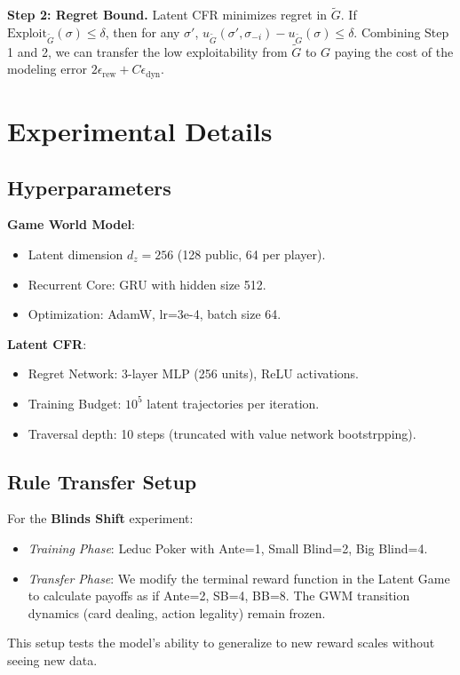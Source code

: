 \documentclass{article}
\begin{document}
\textbf{Step 2: Regret Bound.}
Latent CFR minimizes regret in $\tilde{G}$. If $\text{Exploit}_{\tilde{G}}(\sigma) \le \delta$, then for any $\sigma'$, $u_{\tilde{G}}(\sigma', \sigma_{-i}) - u_{\tilde{G}}(\sigma) \le \delta$.
Combining Step 1 and 2, we can transfer the low exploitability from $\tilde{G}$ to $G$ paying the cost of the modeling error $2\epsilon_\text{rew} + C \epsilon_\text{dyn}$.

\section{Experimental Details}

\subsection{Hyperparameters}
\textbf{Game World Model}:
\begin{itemize}
    \item Latent dimension $d_z = 256$ (128 public, 64 per player).
    \item Recurrent Core: GRU with hidden size 512.
    \item Optimization: AdamW, lr=3e-4, batch size 64.
\end{itemize}

\textbf{Latent CFR}:
\begin{itemize}
    \item Regret Network: 3-layer MLP (256 units), ReLU activations.
    \item Training Budget: $10^5$ latent trajectories per iteration.
    \item Traversal depth: 10 steps (truncated with value network bootstrpping).
\end{itemize}

\subsection{Rule Transfer Setup}
For the \textbf{Blinds Shift} experiment:
\begin{itemize}
    \item \emph{Training Phase}: Leduc Poker with Ante=1, Small Blind=2, Big Blind=4.
    \item \emph{Transfer Phase}: We modify the terminal reward function in the Latent Game to calculate payoffs as if Ante=2, SB=4, BB=8. The GWM transition dynamics (card dealing, action legality) remain frozen.
\end{itemize}
This setup tests the model's ability to generalize to new reward scales without seeing new data.
\end{document}
